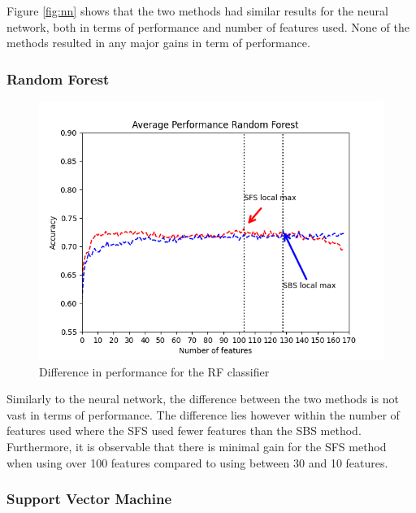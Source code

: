 \documentclass{kththesis}
\begin{document}
Figure \ref{fig:nn} shows that the two methods had similar results for the neural network, both in terms of performance and number of features used. None of the methods resulted in any major gains in term of performance.

\subsubsection{Random Forest}

\begin{figure}[h!]
  \begin{center}
    \includegraphics[scale=0.8]{./figures/Figure_4.png}
    \caption{Difference in performance for the RF classifier}
  \end{center}
\end{figure}

Similarly to the neural network, the difference between the two methods is not vast in terms of performance. The difference lies however within the number of features used where the SFS used fewer features than the SBS method. Furthermore, it is observable that there is minimal gain for the SFS method when using over 100 features compared to using between 30 and 10 features.

\newpage

\subsubsection{Support Vector Machine}
\end{document}
